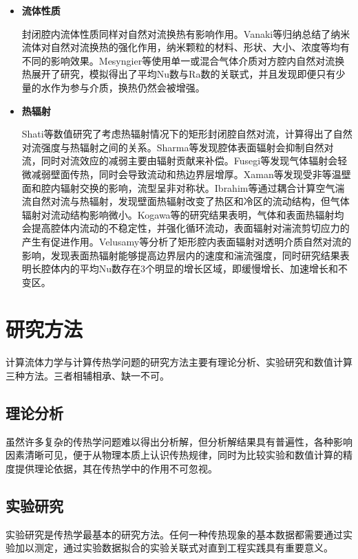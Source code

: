 \documentclass[UTF8]{article} %
\begin{document}
\begin{itemize}
    \item \textbf{流体性质}
    
    封闭腔内流体性质同样对自然对流换热有影响作用。Vanaki\cite{RN9}等归纳总结了纳米流体对自然对流换热的强化作用，纳米颗粒的材料、形状、大小、浓度等均有不同的影响效果。Mesyngier\cite{RN10}等使用单一或混合气体介质对方腔内自然对流换热展开了研究，模拟得出了平均Nu数与Ra数的关联式，并且发现即便只有少量的水作为参与介质，换热仍然会被增强。
    
    \item\textbf{热辐射}
    
    Shati等数值研究了考虑热辐射情况下的矩形封闭腔自然对流，计算得出了自然对流强度与热辐射之间的关系。Sharma等发现腔体表面辐射会抑制自然对流，同时对流效应的减弱主要由辐射贡献来补偿。Fusegi等发现气体辐射会轻微减弱壁面传热，同时会导致流动和热边界层增厚。Xaman等发现受非等温壁面和腔内辐射交换的影响，流型呈非对称状。Ibrahim等通过耦合计算空气湍流自然对流与热辐射，发现壁面热辐射改变了热区和冷区的流动结构，但气体辐射对流动结构影响微小。Kogawa等的研究结果表明，气体和表面热辐射均会提高腔体内流动的不稳定性，并强化循环流动，表面辐射对湍流剪切应力的产生有促进作用。Velusamy等分析了矩形腔内表面辐射对透明介质自然对流的影响，发现表面热辐射能够提高边界层内的速度和湍流强度，同时研究结果表明长腔体内的平均Nu数存在3个明显的增长区域，即缓慢增长、加速增长和不变区\cite{RN11}。

\end{itemize}

\section{研究方法}

计算流体力学与计算传热学问题的研究方法主要有理论分析、实验研究和数值计算三种方法。三者相辅相承、缺一不可\cite{RN12}。

\subsection{理论分析}

虽然许多复杂的传热学问题难以得出分析解，但分析解结果具有普遍性，各种影响因素清晰可见，便于从物理本质上认识传热规律，同时为比较实验和数值计算的精度提供理论依据，其在传热学中的作用不可忽视。

\subsection{实验研究}

实验研究是传热学最基本的研究方法。任何一种传热现象的基本数据都需要通过实验加以测定，通过实验数据拟合的实验关联式对直到工程实践具有重要意义。
\end{document}
